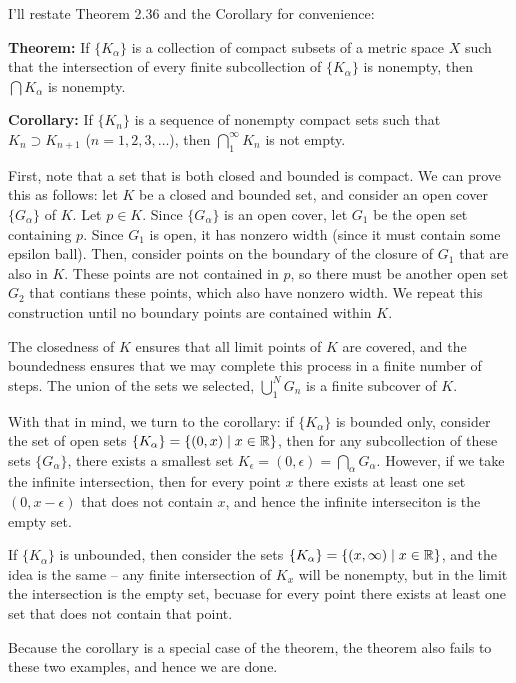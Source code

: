 \documentclass[10pt]{article}
\begin{document}
	\begin{solution}
		I'll restate Theorem 2.36 and the Corollary for convenience:
		
		\begin{center}
			\begin{minipage}{0.9\textwidth}
				\textbf{Theorem:}
					If \( \{K_\alpha\}  \) is a collection of compact subsets of a metric space \( X \) such that the 
					intersection of every finite subcollection of \( \{K_\alpha\}  \) is nonempty, then 
				\( \bigcap K_\alpha \) is nonempty. 

				\medskip
				\textbf{Corollary:} If \( \{K_n\}  \) is a sequence of nonempty compact sets such that \( K_n \supset
				K_{n + 1}\) (\( n = 1,2, 3, \dots \)), then \( \bigcap_1^{\infty} K_n \) is not empty.  
			\end{minipage}
		\end{center}
		First, note that a set that is both closed and bounded is compact. We can prove this as follows: let 
		\( K \) be a closed and bounded set, and consider an open cover \( \{G_\alpha\}  \) of \( K \). 
		Let \( p \in K  \). Since \( \{G_\alpha\}  \) is an open cover, let \( G_1 \) be the open set 
		containing \( p \). Since \( G_1 \) is open, it has nonzero width (since it must contain some epsilon 
		ball). Then, consider points on the boundary of the closure of \( G_1 \) that are also 
		in \( K \). These points are not contained in \( p \), so there must be another open set \( G_2 \) that 
		contians these points, which also have nonzero width. We repeat this construction until no boundary points are 
		contained within \( K \).

		The closedness of \( K \) ensures that all limit points of \( K \) are covered, and the boundedness ensures 
		that we may complete this process in a finite number of steps. The union of the sets we selected, 
		\( \bigcup_1^{N}G_n \) is a finite subcover of \( K \). 

		With that in mind, we turn to the corollary: if \( \{K_\alpha\}  \) is bounded only, consider the set 
		of open sets \( \{K_\alpha\} = \{(0, x) \mid x \in \mathbb R \}\), then for any subcollection 
		of these sets \( \{G_\alpha\}  \), there exists a smallest set 
		\( K_\epsilon = (0, \epsilon) = \bigcap_\alpha G_\alpha  \). However, if we take the infinite intersection, 
		then for every point \( x \) there exists at least one set \( (0, x - \epsilon) \) that 
		does not contain \( x \), and hence the infinite interseciton is the empty set. 

		If \( \{K_\alpha\}  \) is unbounded, then consider the sets \( \{K_\alpha\}  = 
		\{(x, \infty) \mid x \in \mathbb R\} \), and the idea is the same -- any finite intersection of \( K_{x} \) will 
		be nonempty, but in the limit the intersection is the empty set, becuase for every point there exists 
		at least one set that does not contain that point. 

		Because the corollary is a special case of the theorem, the theorem also fails to these two 
		examples, and hence we are done. 
	\end{solution}
\end{document}

